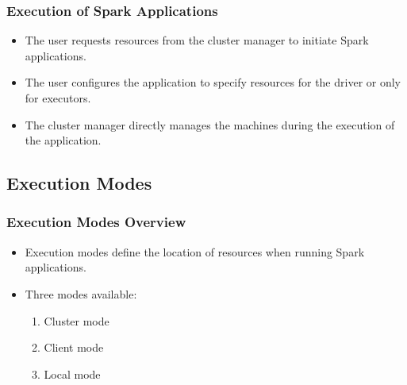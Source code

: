 \begin{frame}
    \frametitle{Execution of Spark Applications}
    \begin{itemize}
        \item The user requests resources from the cluster manager to initiate Spark applications.
        \item The user configures the application to specify resources for the driver or only for executors.
        \item The cluster manager directly manages the machines during the execution of the application.
    \end{itemize}
\end{frame}

\subsection{Execution Modes}\label{subsec:deployment-mode}
\begin{frame}
    \frametitle{Execution Modes Overview}
    \begin{itemize}
        \item Execution modes define the location of resources when running Spark applications.
        \item Three modes available:
        \begin{enumerate}
            \item Cluster mode
            \item Client mode
            \item Local mode
        \end{enumerate}
    \end{itemize}
\end{frame}

